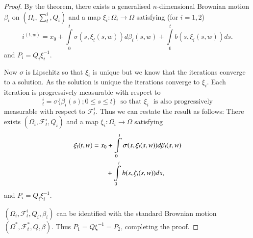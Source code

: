 \begin{proof}
By the theorem, there exists a generalised $n$-dimensional Brownian
motion $\beta_{i}$ on $(\Omega_{i},\sum^{i}_{t},Q_{i})$ and a map
$\xi_{i}:\Omega_{i}\to \Omega$ satisfying (for $i=1,2$)
$$
i^{(t,w)}=x_{0}+\int\limits^{t}_{0}\sigma(s,\xi_{i}(s,w))d\beta_{i}(s,w)+\int\limits^{t}_{0}b(s,\xi_{i}(s,w))ds. 
$$
and $P_{i}=Q_{i}\xi^{-1}_{i}$.

Now $\sigma$ is Lipschitz so that $\xi_{i}$ is unique but we know that
the iterations converge to a solution. As the solution is unique the
iterations converge to $\xi_{i}$. Each iteration is progressively
measurable with respect to
$$
{}^{i}_{t}=\sigma\{\beta_{i}(s);0\leq s\leq t\}\text{~ so that~
}\xi_{i}\text{~ is also progressively}
$$
measurable with respect to $\mathscr{F}^{i}_{t}$. Thus we can restate
the result as follows: There exists
$(\Omega_{i},\mathscr{F}^{i}_{t},Q_{i})$ and a map
$\xi_{i}:\Omega_{i}\to \Omega$ satisfying 
\begin{align*}
\xi_{i}(t,w) &=
x_{0}+\int\limits^{t}_{0}\sigma(s,\xi_{i}(s,w))d\beta_{i}(s,w)\\
&\qquad +\int\limits^{t}_{0}b(s,\xi_{i}(s,w))ds,
\end{align*}
and $P_{i}=Q_{i}\xi^{-1}_{i}$.

$(\Omega_{i},\mathscr{F}^{i}_{t},Q_{i},\beta_{i})$ can be identified
with the standard Brownian motion
$(\Omega^{*},\mathscr{F}^{*}_{t},Q,\beta)$. Thus
$P_{1}=Q\xi^{-1}=P_{2}$, completing the proof.
\end{proof}












